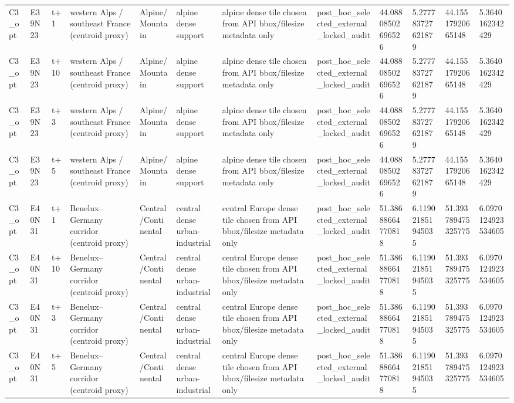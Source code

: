 \begin{landscape}
\begin{longtable}{llllllllllll}
C3\_opt & E39N23 & t+1 & western Alps / southeast France (centroid proxy) & Alpine/Mountain & alpine dense support & alpine dense tile chosen from API bbox/filesize metadata only & post\_hoc\_selected\_external\_locked\_audit & 44.08808502696526 & 5.277783727621879 & 44.15517920665148 & 5.3640162342429 \\
C3\_opt & E39N23 & t+10 & western Alps / southeast France (centroid proxy) & Alpine/Mountain & alpine dense support & alpine dense tile chosen from API bbox/filesize metadata only & post\_hoc\_selected\_external\_locked\_audit & 44.08808502696526 & 5.277783727621879 & 44.15517920665148 & 5.3640162342429 \\
C3\_opt & E39N23 & t+3 & western Alps / southeast France (centroid proxy) & Alpine/Mountain & alpine dense support & alpine dense tile chosen from API bbox/filesize metadata only & post\_hoc\_selected\_external\_locked\_audit & 44.08808502696526 & 5.277783727621879 & 44.15517920665148 & 5.3640162342429 \\
C3\_opt & E39N23 & t+5 & western Alps / southeast France (centroid proxy) & Alpine/Mountain & alpine dense support & alpine dense tile chosen from API bbox/filesize metadata only & post\_hoc\_selected\_external\_locked\_audit & 44.08808502696526 & 5.277783727621879 & 44.15517920665148 & 5.3640162342429 \\
C3\_opt & E40N31 & t+1 & Benelux–Germany corridor (centroid proxy) & Central/Continental & central dense urban-industrial & central Europe dense tile chosen from API bbox/filesize metadata only & post\_hoc\_selected\_external\_locked\_audit & 51.38688664770818 & 6.119021851945035 & 51.393789475325775 & 6.0970124923534605 \\
C3\_opt & E40N31 & t+10 & Benelux–Germany corridor (centroid proxy) & Central/Continental & central dense urban-industrial & central Europe dense tile chosen from API bbox/filesize metadata only & post\_hoc\_selected\_external\_locked\_audit & 51.38688664770818 & 6.119021851945035 & 51.393789475325775 & 6.0970124923534605 \\
C3\_opt & E40N31 & t+3 & Benelux–Germany corridor (centroid proxy) & Central/Continental & central dense urban-industrial & central Europe dense tile chosen from API bbox/filesize metadata only & post\_hoc\_selected\_external\_locked\_audit & 51.38688664770818 & 6.119021851945035 & 51.393789475325775 & 6.0970124923534605 \\
C3\_opt & E40N31 & t+5 & Benelux–Germany corridor (centroid proxy) & Central/Continental & central dense urban-industrial & central Europe dense tile chosen from API bbox/filesize metadata only & post\_hoc\_selected\_external\_locked\_audit & 51.38688664770818 & 6.119021851945035 & 51.393789475325775 & 6.0970124923534605 \\

\end{longtable}
\end{landscape}
